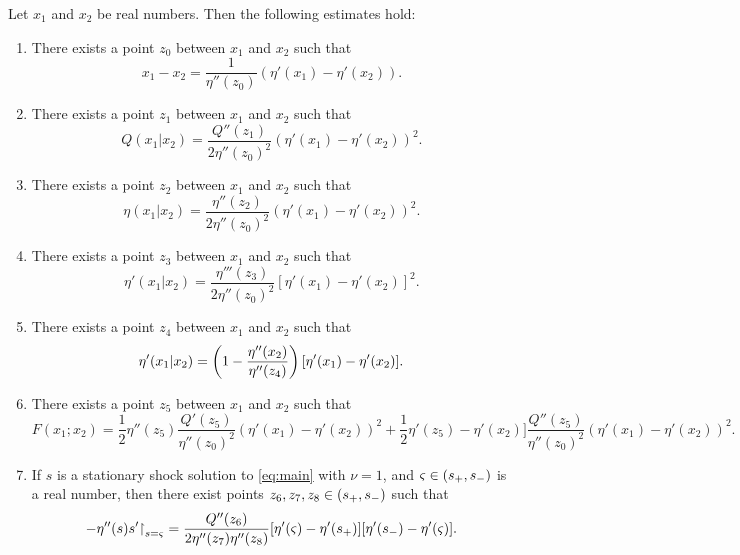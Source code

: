 \begin{lemma}\label{thm:taylor}
Let $x_1$ and $x_2$ be real numbers.  Then the following estimates hold:
\begin{enumerate}[label=(\alph*)]
\item \label{taylor u-s}
There exists a point $z_0$ between $x_1$ and $x_2$ such that
\[ x_1-x_2 = \frac{1}{\eta''(z_0)}(\eta'(x_1)-\eta'(x_2)). \]
\item \label{taylor Q}
There exists a point $z_1$ between $x_1$ and $x_2$ such that
\[ Q(x_1|x_2) = \frac{Q''(z_1)}{2\eta''(z_0)^2}(\eta'(x_1)-\eta'(x_2))^2. \]
\item \label{taylor eta}
There exists a point $z_2$ between $x_1$ and $x_2$ such that
\[ \eta(x_1|x_2) = \frac{\eta''(z_2)}{2\eta''(z_0)^2} (\eta'(x_1)-\eta'(x_2))^2. \]
\item \label{taylor eta' thrd}
There exists a point $z_3$ between $x_1$ and $x_2$ such that
\[ \eta'(x_1|x_2) = \frac{\eta'''(z_3)}{2\eta''(z_0)^2} [\eta'(x_1)-\eta'(x_2)]^2. \]
\item \label{taylor eta' scnd}
There exists a point $z_4$ between $x_1$ and $x_2$ such that
\[ \eta'(x_1|x_2) = \left( 1 - \frac{\eta''(x_2)}{\eta''(z_4)} \right)[\eta'(x_1) - \eta'(x_2)]. \]
\item \label{taylor F}
There exists a point $z_5$ between $x_1$ and $x_2$ such that
\[ F(x_1;x_2) = \frac{1}{2}\eta''(z_5) \frac{Q'(z_5)}{\eta''(z_0)^2} (\eta'(x_1)-\eta'(x_2))^2 + \frac{1}{2}\eta'(z_5)-\eta'(x_2)] \frac{Q''(z_5)}{\eta''(z_0)^2} (\eta'(x_1)-\eta'(x_2))^2. \]
\item \label{taylor 1-y2}
If $s$ is a stationary shock solution to \eqref{eq:main} with $\nu = 1$, and $\varsigma \in (s_+,s_-)$ is a real number, then there exist points $z_6, z_7, z_8 \in (s_+,s_-)$ such that
\[ -\eta''(s) s'{\upharpoonright}_{s=\varsigma} = \frac{Q''(z_6)}{2\eta''(z_7) \eta''(z_8)} [\eta'(\varsigma) - \eta'(s_+)][\eta'(s_-) - \eta'(\varsigma)]. \]
\end{enumerate}
\end{lemma}

